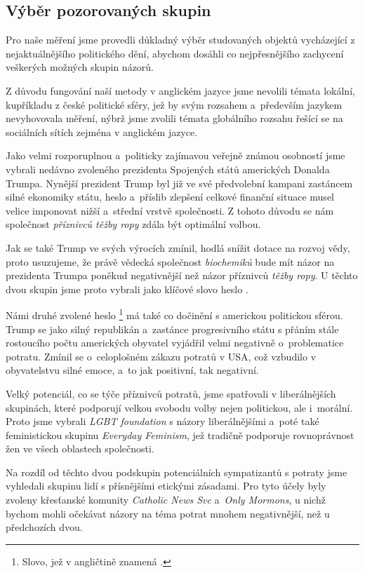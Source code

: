 \documentclass[12pt, a4paper]{article}
\numberwithin{equation}{section} 	%
\begin{document}
\subsection{Výběr pozorovaných skupin}
\noindent Pro naše měření jsme provedli důkladný výběr studovaných objektů vycházející z nejaktuálnějšího politického dění, abychom dosáhli co nejpřesnějšího zachycení veškerých možných skupin názorů.

Z důvodu fungování naší metody v anglickém jazyce jsme nevolili témata lokální, kupříkladu z české politické sféry, jež by svým rozsahem a~především jazykem nevyhovovala měření, nýbrž jsme zvolili témata globálního rozsahu řešící se na sociálních sítích zejména v anglickém jazyce.

Jako velmi rozporuplnou a~politicky zajímavou veřejně známou osobností jsme vybrali nedávno zvoleného prezidenta Spojených států amerických Donalda Trumpa. Nynější prezident Trump byl již ve své předvolební kampani zastáncem silné ekonomiky státu, heslo  a~příslib zlepšení celkové finanční situace musel velice imponovat nižší a~střední vrstvě společnosti. Z tohoto důvodu se nám společnost \textit{příznivců těžby ropy} zdála být optimální volbou.

Jak se také Trump ve svých výrocích zmínil, hodlá snížit dotace na rozvoj vědy, proto usuzujeme, že právě vědecká společnost \textit{biochemiků} bude mít názor na prezidenta Trumpa poněkud negativnější než názor příznivců \textit{těžby ropy}. U těchto dvou skupin jsme proto vybrali jako klíčové slovo heslo \textit{}.

Námi druhé zvolené heslo \textit{}\footnote{Slovo, jež v angličtině znamená \textit{}.} má také co dočinění s americkou politickou sférou. Trump se jako silný republikán a~zastánce progresivního státu s přáním stále rostoucího počtu amerických obyvatel vyjádřil velmi negativně o~problematice potratu. Zmínil se o~celoplošném zákazu potratů v USA, což vzbudilo v obyvatelstvu silné emoce, a~to jak positivní, tak negativní.

Velký potenciál, co se týče příznivců potratů, jsme spatřovali v liberálnějších skupinách, které podporují velkou svobodu volby nejen politickou, ale i~morální. Proto jsme vybrali \textit{LGBT foundation} s názory liberálnějšími a~poté také feministickou skupinu \textit{Everyday Feminism}, jež tradičně podporuje rovnoprávnost žen ve všech oblastech společnosti.

Na rozdíl od těchto dvou podskupin potenciálních sympatizantů s potraty jsme vyhledali skupinu lidí s přísnějšími etickými zásadami. Pro tyto účely byly zvoleny křesťanské komunity \textit{Catholic News Svc} a~\textit{Only Mormons}, u nichž bychom mohli očekávat názory na téma potrat mnohem negativnější, než u předchozích dvou.
\end{document}
